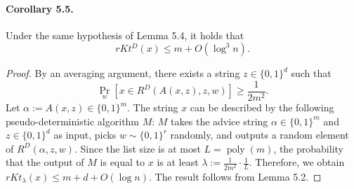 \paragraph{Corollary 5.5.}
Under the same hypothesis of Lemma 5.4, it holds that
\[rKt^D(x)\leq m+O(\log^3 n).\]
\begin{proof}
By an averaging argument, there exists a string $z\in\{0,1\}^d$ such that
\[\Pr_w[x\in R^D(A(x,z),z,w)]\geq\frac1{2m^2}.\]
Let $\alpha:=A(x,z)\in\{0,1\}^m$. The string $x$ can be described by the following pseudo-deterministic algorithm $M$: $M$ takes the advice string $\alpha\in\{0,1\}^m$ and $z\in\{0,1\}^d$ as input, picks $w\sim\{0,1\}^r$ randomly, and outputs a random element of $R^D(\alpha,z,w)$. Since the list size is at most $L=\operatorname{poly}(m)$, the probability that the output of $M$ is equal to $x$ is at least $\lambda:=\frac1{2m^2}\cdot\frac1L$. Therefore, we obtain $rKt_\lambda(x)\leq m+d+O(\log n)$. The result follows from Lemma 5.2.
\end{proof}
